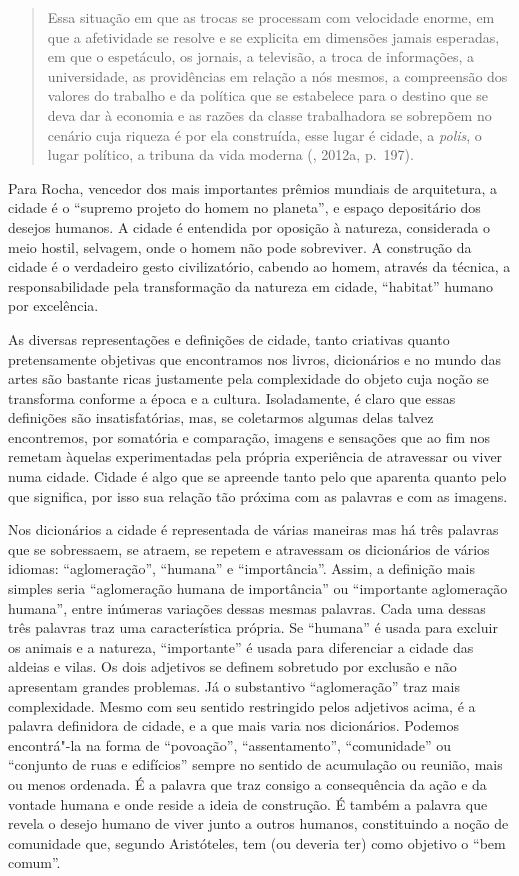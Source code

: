 \begin{quote}
Essa situação em que as trocas se processam com velocidade enorme, em
que a afetividade se resolve e se explicita em dimensões jamais
esperadas, em que o espetáculo, os jornais, a televisão, a troca de
informações, a universidade, as providências em relação a nós mesmos, a
compreensão dos valores do trabalho e da política que se estabelece para
o destino que se deva dar à economia e as razões da classe trabalhadora
se sobrepõem no cenário cuja riqueza é por ela construída, esse lugar é
cidade, a \emph{polis}, o lugar político, a tribuna da vida moderna (, 2012a, p.~197).
\end{quote}

Para Rocha, vencedor dos mais importantes prêmios mundiais de
arquitetura, a cidade é o ``supremo projeto do homem no planeta'', e
espaço depositário dos desejos humanos. A cidade é entendida por
oposição à natureza, considerada o meio hostil, selvagem, onde o homem
não pode sobreviver. A construção da cidade é o verdadeiro gesto
civilizatório, cabendo ao homem, através da técnica, a responsabilidade
pela transformação da natureza em cidade, ``habitat'' humano por
excelência.

As diversas representações e definições de cidade, tanto criativas
quanto pretensamente objetivas que encontramos nos livros, dicionários e
no mundo das artes são bastante ricas justamente pela complexidade do
objeto cuja noção se transforma conforme a época e a cultura.
Isoladamente, é claro que essas definições são insatisfatórias, mas, se
coletarmos algumas delas talvez encontremos, por somatória e comparação,
imagens e sensações que ao fim nos remetam àquelas experimentadas pela
própria experiência de atravessar ou viver numa cidade. Cidade é algo
que se apreende tanto pelo que aparenta quanto pelo que significa, por
isso sua relação tão próxima com as palavras e com as imagens.

Nos dicionários a cidade é representada de várias maneiras mas há três
palavras que se sobressaem, se atraem, se repetem e atravessam os
dicionários de vários idiomas: ``aglomeração'', ``humana'' e
``importância''. Assim, a definição mais simples seria ``aglomeração
humana de importância'' ou ``importante aglomeração humana'', entre
inúmeras variações dessas mesmas palavras. Cada uma dessas três palavras
traz uma característica própria. Se ``humana'' é usada para excluir os
animais e a natureza, ``importante'' é usada para diferenciar a cidade
das aldeias e vilas. Os dois adjetivos se definem sobretudo por exclusão
e não apresentam grandes problemas. Já o substantivo ``aglomeração''
traz mais complexidade. Mesmo com seu sentido restringido pelos
adjetivos acima, é a palavra definidora de cidade, e a que mais varia
nos dicionários. Podemos encontrá"-la na forma de ``povoação'',
``assentamento'', ``comunidade'' ou ``conjunto de ruas e edifícios''
sempre no sentido de acumulação ou reunião, mais ou menos ordenada. É a
palavra que traz consigo a consequência da ação e da vontade humana e
onde reside a ideia de construção. É também a palavra que revela o
desejo humano de viver junto a outros humanos, constituindo a noção de
comunidade que, segundo Aristóteles, tem (ou deveria ter) como objetivo
o ``bem comum''.

